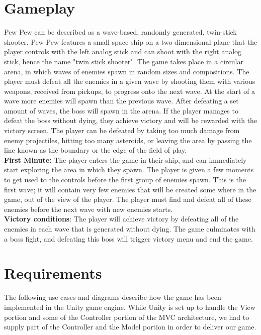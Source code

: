 \documentclass[12pt]{article}       %
\def\hs{\hspace{15pt}}
\begin{document}
\section{Gameplay} %
\label{sec:Gameplay}

\hs {\bf Core Concept: }Pew Pew can be described as a wave-based, randomly generated, twin-stick shooter. Pew Pew features a small space ship on a two dimensional plane that the player controls with the left analog stick and can shoot with the right analog stick, hence the name "twin stick shooter". The game takes place in a circular arena, in which waves of enemies spawn in random sizes and compositions. The player must defeat all the enemies in a given wave by shooting them with various weapons, received from pickups, to progress onto the next wave. At the start of a wave more enemies will spawn than the previous wave. After defeating a set amount of waves, the boss will spawn in the arena. If the player manages to defeat the boss without dying, they achieve victory and will be rewarded with the victory screen. The player can be defeated by taking too much damage from enemy projectiles, hitting too many asteroids, or leaving the area by passing the line known as the boundary or the edge of the field of play. \\

{\bf First Minute:} The player enters the game in their ship, and can immediately start exploring the area in which they spawn. The player is given a few moments to get used to the controls before the first group of enemies spawn. This is the first wave; it will contain very few enemies that will be created some where in the game, out of the view of the player. The player must find and defeat all of these enemies before the next wave with new enemies starts. \\

{\bf Victory conditions}: The player will achieve victory by defeating all of the enemies in each wave that is generated without dying. The game culminates with a boss fight, and defeating this boss will trigger victory menu and end the game.

\section{Requirements} %
\label{sec:Requirements}

\hs The following use cases and diagrams describe how the game has been implemented in the Unity game engine. While Unity is set up to handle the View portion and some of the Controller portion of the MVC architecture, we had to supply part of the Controller and the Model portion in order to deliver our game.
\end{document}
